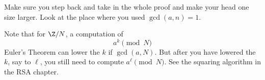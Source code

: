 Make sure you step back and take in the whole proof and make your
head one size larger. Look at the place where you used
$\gcd(a,n)=1$.

Note that for $\Z/N$, a computation of
\[
a^k \pmod{N}
\]
Euler's Theorem can lower the $k$ if $\gcd(a, N)$.
But after you have lowered the $k$, say to $\ell$,
you still need to compute $a^\ell \pmod{N}$.
See the squaring algorithm in the RSA chapter.











